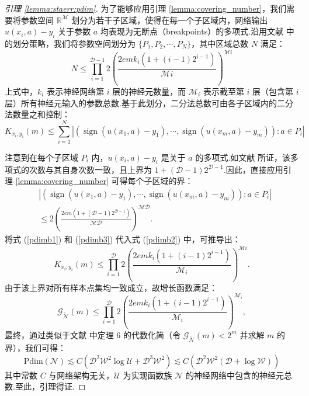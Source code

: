 \begin{proof}[引理 \ref{lemma:staerr:pdim}]
为了能够应用引理 \ref{lemma:covering_number}，我们需要将参数空间 $\mathbb{R}^{\mathcal{M}}$ 划分为若干子区域，使得在每一个子区域内，网络输出 $u(x_i,a)-y_i$ 关于参数 $a$ 均表现为无断点（breakpoints）的多项式.沿用文献 \cite{bartlett2019nearly} 中的划分策略，我们将参数空间划分为 $\{P_1,P_2,\cdots,P_N\}$，其中区域总数 $N$ 满足：
\begin{equation} \label{pdimb1}
N\leq\prod_{i=1}^{\mathcal{D}-1}2\left(\frac{2emk_i(1+(i-1)2^{i-1})}{\mathcal{M}i}\right)^{\mathcal{M}i}
\end{equation}
上式中，$k_i$ 表示神经网络第 $i$ 层的神经元数量，而 $\mathcal{M}_i$ 表示截至第 $i$ 层（包含第 $i$ 层）所有神经元输入的参数总数.基于此划分，二分法总数可由各子区域内的二分法数量之和控制：
\begin{equation} \label{pdimb2}
K_{{x_i},{y_i}}(m)\leq\sum_{i=1}^{N}|{(\operatorname{sign}(u(x_{1}, a)-y_1), \cdots, \operatorname{sign}(u(x_{m}, a)-y_m)): a\in P_i}|
\end{equation}

注意到在每个子区域 $P_i$ 内，$u(x_i,a)-y_i$ 是关于 $a$ 的多项式.如文献 \cite{bartlett2019nearly} 所证，该多项式的次数与其自身次数一致，且上界为 $1 + (\mathcal{D}-1)2^{\mathcal{D}-1}$.因此，直接应用引理 \ref{lemma:covering_number} 可得每个子区域的界：
\begin{align}
& |{(\operatorname{sign}(u(x_{1}, a)-y_1), \cdots, \operatorname{sign}(u(x_{m}, a)-y_m)): a\in P_i}|\nonumber \\
& \leq2\left(\frac{2em(1+(\mathcal{D}-1)2^{\mathcal{D}-1})}{\mathcal{M}{\mathcal{D}}}\right)^{\mathcal{M}{\mathcal{D}}}\label{pdimb3}.
\end{align}
将式 (\ref{pdimb1}) 和 (\ref{pdimb3}) 代入式 (\ref{pdimb2}) 中，可推导出：
\begin{equation*}
K_{{x_i},{y_i}}(m)\leq\prod_{i=1}^{\mathcal{D}}2\left(\frac{2emk_i(1+(i-1)2^{i-1})}{\mathcal{M}_i}\right)^{\mathcal{M}i}.
\end{equation*}
由于该上界对所有样本点集均一致成立，故增长函数满足：
\begin{equation*}
\mathcal{G}_{\widetilde{\mathcal{N}}}(m)\leq\prod_{i=1}^{\mathcal{D}}2\left(\frac{2emk_i(1+(i-1)2^{i-1})}{\mathcal{M}_i}\right)^{\mathcal{M}_i},
\end{equation*}
最终，通过类似于文献 \cite{bartlett2019nearly} 中定理 6 的代数化简（令 $\mathcal{G}_{\widetilde{\mathcal{N}}}(m) < 2^m$ 并求解 $m$ 的界），我们可得：
\begin{equation*}
\mathrm{Pdim}(\mathcal{N})\lesssim C\left(\mathcal{D}^2\mathcal{W}^2 \log \mathcal{U}+\mathcal{D}^3\mathcal{W}^2\right)
\lesssim C\left(\mathcal{D}^2\mathcal{W}^2\left( \mathcal{D}+\log \mathcal{W}\right)\right)
\end{equation*}
其中常数 $C$ 与网络架构无关，$\mathcal{U}$ 为实现函数族 $\mathcal{N}$ 的神经网络中包含的神经元总数.至此，引理得证.
\end{proof}




